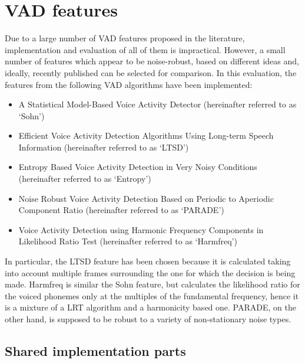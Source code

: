 
\section{VAD features}

Due to a large number of VAD features proposed in the literature, implementation and evaluation of all of them is impractical. However, a small number of features which appear to be noise-robust, based on different ideas and, ideally, recently published can be selected for comparison. In this evaluation, the features from the following VAD algorithms have been implemented:

\begin{itemize}
\item A Statistical Model-Based Voice Activity Detector \cite{Sohn} (hereinafter referred to as `Sohn')
\item Efficient Voice Activity Detection Algorithms Using Long-term Speech Information \cite{LTSD} (hereinafter referred to as `LTSD')
\item Entropy Based Voice Activity Detection in Very Noisy Conditions \citep{Renevey} (hereinafter referred to as `Entropy')
\item Noise Robust Voice Activity Detection Based on Periodic to Aperiodic Component Ratio \cite{PARADE} (hereinafter referred to as `PARADE')
\item Voice Activity Detection using Harmonic Frequency Components in Likelihood Ratio Test \cite{Tan} (hereinafter referred to as `Harmfreq')
\end{itemize}

In particular, the LTSD feature has been chosen because it is calculated taking into account multiple frames surrounding the one for which the decision is being made. Harmfreq is similar the Sohn feature, but calculates the likelihood ratio for the voiced phonemes only at the multiples of the fundamental frequency, hence it is a mixture of a LRT algorithm and a harmonicity based one. PARADE, on the other hand, is supposed to be robust to a variety of non-stationary noise types.

\subsection{Shared implementation parts}

